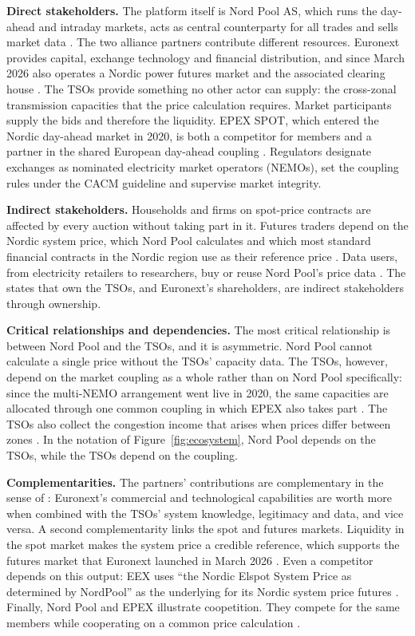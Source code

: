 \textbf{Direct stakeholders.} The platform itself is Nord Pool AS, which runs the day-ahead and intraday markets, acts as central counterparty for all trades and sells market data \citep{NPAbout,NPClearing}. The two alliance partners contribute different resources. Euronext provides capital, exchange technology and financial distribution, and since March 2026 also operates a Nordic power futures market and the associated clearing house \citep{Euronext2026}. The TSOs provide something no other actor can supply: the cross-zonal transmission capacities that the price calculation requires. Market participants supply the bids and therefore the liquidity. EPEX SPOT, which entered the Nordic day-ahead market in 2020, is both a competitor for members and a partner in the shared European day-ahead coupling \citep{EPEX2020}. Regulators designate exchanges as nominated electricity market operators (NEMOs), set the coupling rules under the CACM guideline \citep{CACM2015} and supervise market integrity.

\textbf{Indirect stakeholders.} Households and firms on spot-price contracts are affected by every auction without taking part in it. Futures traders depend on the Nordic system price, which Nord Pool calculates and which most standard financial contracts in the Nordic region use as their reference price \citep{NPPrice}. Data users, from electricity retailers to researchers, buy or reuse Nord Pool's price data \citep{NPData,ERR2022}. The states that own the TSOs, and Euronext's shareholders, are indirect stakeholders through ownership.



\textbf{Critical relationships and dependencies.} The most critical relationship is between Nord Pool and the TSOs, and it is asymmetric. Nord Pool cannot calculate a single price without the TSOs' capacity data. The TSOs, however, depend on the market coupling as a whole rather than on Nord Pool specifically: since the multi-NEMO arrangement went live in 2020, the same capacities are allocated through one common coupling in which EPEX also takes part \citep{EPEX2020}. The TSOs also collect the congestion income that arises when prices differ between zones \citep{EU2019943}. In the notation of Figure~\ref{fig:ecosystem}, Nord Pool depends on the TSOs, while the TSOs depend on the coupling.

\textbf{Complementarities.} The partners' contributions are complementary in the sense of \citet{Jacobides2018}: Euronext's commercial and technological capabilities are worth more when combined with the TSOs' system knowledge, legitimacy and data, and vice versa. A second complementarity links the spot and futures markets. Liquidity in the spot market makes the system price a credible reference, which supports the futures market that Euronext launched in March 2026 \citep{Euronext2026}. Even a competitor depends on this output: EEX uses ``the Nordic Elspot System Price as determined by NordPool'' as the underlying for its Nordic system price futures \citep{EEX2024}. Finally, Nord Pool and EPEX illustrate coopetition. They compete for the same members while cooperating on a common price calculation \citep[Def.~8.4]{OverbyAudestad2021}.

